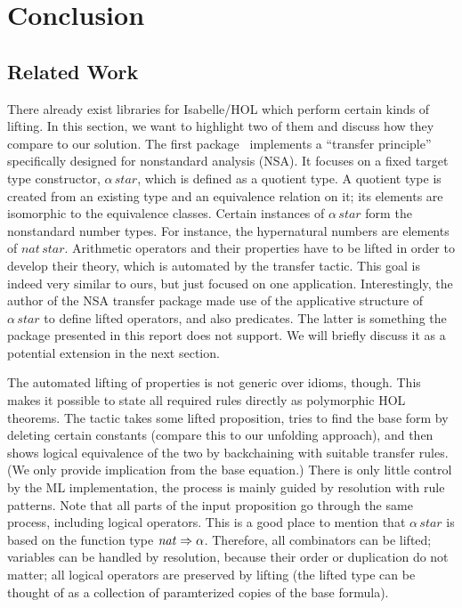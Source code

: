 \section{Conclusion}\label{sec:conclusion}

\subsection{Related Work}\label{subsec:related-work}

There already exist libraries for Isabelle/HOL which perform certain kinds of
lifting.
In this section, we want to highlight two of them and discuss how they compare
to our solution.
The first package~\cite{huffman05} implements a ``transfer principle''
specifically designed for nonstandard analysis (NSA).
It focuses on a fixed target type constructor, $\alpha\,\mathit{star}$, which is
defined as a quotient type.
A quotient type is created from an existing type and an equivalence relation
on it; its elements are isomorphic to the equivalence classes.
Certain instances of $\alpha\,\mathit{star}$ form the nonstandard number types.
For instance, the hypernatural numbers are elements of $\mathit{nat}\,\mathit{star}$.
Arithmetic operators and their properties have to be lifted in order to develop
their theory, which is automated by the transfer tactic.
This goal is indeed very similar to ours, but just focused on one application.
Interestingly, the author of the NSA transfer package made use of the applicative
structure of $\alpha\,\mathit{star}$ to define lifted operators, and also predicates.
The latter is something the package presented in this report does not support.
We will briefly discuss it as a potential extension in the next section.

The automated lifting of properties is not generic over idioms, though.
This makes it possible to state all required rules directly as polymorphic
HOL theorems.
The tactic takes some lifted proposition, tries to find the base form by
deleting certain constants (compare this to our unfolding approach), and then
shows logical equivalence of the two by backchaining with suitable transfer
rules.
(We only provide implication from the base equation.)
There is only little control by the ML implementation, the process is mainly
guided by resolution with rule patterns.
Note that all parts of the input proposition go through the same process,
including logical operators.
This is a good place to mention that $\alpha\,\mathit{star}$ is based
on the function type $\mathit{nat} \Rightarrow \alpha$.
Therefore, all combinators can be lifted; variables can be handled by
resolution, because their order or duplication do not matter; all logical
operators are preserved by lifting (the lifted type can be thought of
as a collection of paramterized copies of the base formula).

